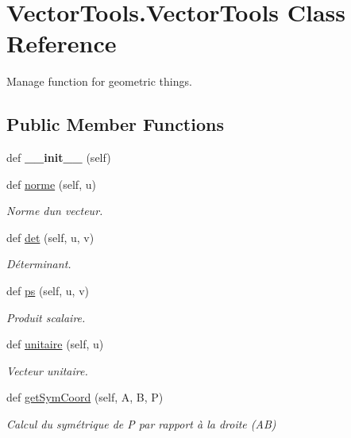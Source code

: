\hypertarget{classVectorTools_1_1VectorTools}{}\section{Vector\+Tools.\+Vector\+Tools Class Reference}
\label{classVectorTools_1_1VectorTools}


Manage function for geometric things.  


\subsection*{Public Member Functions}
\begin{DoxyCompactItemize}
\item 
\mbox{\label{classVectorTools_1_1VectorTools_aa2d08fb6f4e5a19b60b4012edd221f85}} 
def {\bfseries \+\_\+\+\_\+init\+\_\+\+\_\+} (self)
\item 
def \mbox{\hyperlink{classVectorTools_1_1VectorTools_a3107082890e30f443449a54d8bdc7a7c}{norme}} (self, u)
\begin{DoxyCompactList}\small\item\em Norme d\textquotesingle{}un vecteur. \end{DoxyCompactList}\item 
def \mbox{\hyperlink{classVectorTools_1_1VectorTools_abae91b193f8b6ac2620145a3c22fbf7a}{det}} (self, u, v)
\begin{DoxyCompactList}\small\item\em Déterminant. \end{DoxyCompactList}\item 
def \mbox{\hyperlink{classVectorTools_1_1VectorTools_a3ff68f5d2133fcd83c08f9bc30357e52}{ps}} (self, u, v)
\begin{DoxyCompactList}\small\item\em Produit scalaire. \end{DoxyCompactList}\item 
def \mbox{\hyperlink{classVectorTools_1_1VectorTools_afd77fdcf2847d51f431ca42994ebce77}{unitaire}} (self, u)
\begin{DoxyCompactList}\small\item\em Vecteur unitaire. \end{DoxyCompactList}\item 
def \mbox{\hyperlink{classVectorTools_1_1VectorTools_af874616506959d3d545fc9e48e589e4a}{get\+Sym\+Coord}} (self, A, B, P)
\begin{DoxyCompactList}\small\item\em Calcul du symétrique de P par rapport à la droite (AB) \end{DoxyCompactList}\item 

\end{DoxyCompactItemize}
